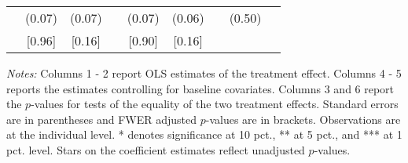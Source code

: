 \begin{table}[htbp]
{\begin{threeparttable}
\begin{tabular}{l*{8}{c}}
          &   (0.07)&   (0.07)&         &   (0.07)&   (0.06)&         &   (0.50)&         \\
          &   [0.96]&   [0.16]&         &   [0.90]&   [0.16]&         &         &         \\
\bottomrule \end{tabular} \begin{tablenotes}[flushleft] \footnotesize \item \emph{Notes:} Columns 1 - 2 report OLS estimates of the treatment effect. Columns 4 - 5 reports the estimates controlling for baseline covariates. Columns 3 and 6 report the \(p\)-values for tests of the equality of the two treatment effects. Standard errors are in parentheses and FWER adjusted \(p\)-values are in brackets. Observations are at the individual level. * denotes significance at 10 pct., ** at 5 pct., and *** at 1 pct. level. Stars on the coefficient estimates reflect unadjusted \(p\)-values. \end{tablenotes} \end{threeparttable} } \end{table}

